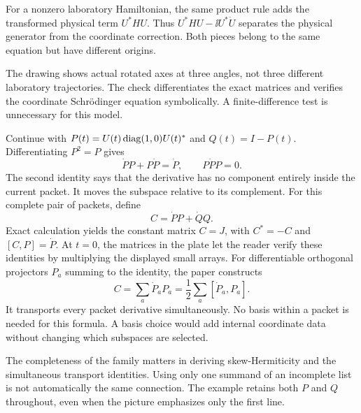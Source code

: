For a nonzero laboratory Hamiltonian, the same product rule adds the transformed physical term $U^*HU$. Thus $U^*HU-\ii U^*\dot U$ separates the physical generator from the coordinate correction. Both pieces belong to the same equation but have different origins.

The drawing shows actual rotated axes at three angles, not three different laboratory trajectories. The check differentiates the exact matrices and verifies the coordinate Schr\"odinger equation symbolically. A finite-difference test is unnecessary for this model.

Continue with $P(t)=U(t)\operatorname{diag}(1,0)U(t)^*$ and $Q(t)=I-P(t)$. Differentiating $P^2=P$ gives
\[
\dot P P+P\dot P=\dot P,
\qquad P\dot P P=0.
\]
The second identity says that the derivative has no component entirely inside the current packet. It moves the subspace relative to its complement.
For this complete pair of packets, define
\[
C=\dot P P+\dot Q Q.
\]
Exact calculation yields the constant matrix $C=J$, with $C^*=-C$ and $[C,P]=\dot P$. At $t=0$, the matrices in the plate let the reader verify these identities by multiplying the displayed small arrays.
For differentiable orthogonal projectors $P_a$ summing to the identity, the paper constructs
\[
C=\sum_a\dot P_aP_a=\frac12\sum_a[\dot P_a,P_a].
\]
It transports every packet derivative simultaneously. No basis within a packet is needed for this formula. A basis choice would add internal coordinate data without changing which subspaces are selected.

The completeness of the family matters in deriving skew-Hermiticity and the simultaneous transport identities. Using only one summand of an incomplete list is not automatically the same connection. The example retains both $P$ and $Q$ throughout, even when the picture emphasizes only the first line.

